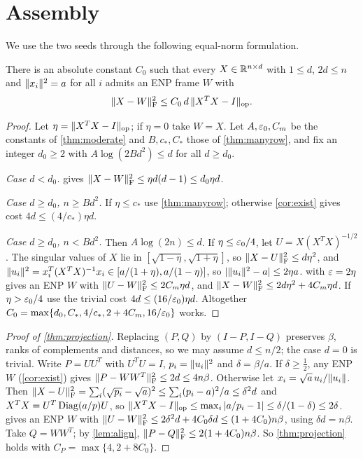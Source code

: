\section{Assembly}\label{sec:assembly}

We use the two seeds through the following equal-norm formulation.

\begin{proposition}\label{prop:equalrow}
There is an absolute constant $C_0$ such that every $X\in\mathbb R^{n\times d}$ with
$1\le d$, $2d\le n$ and $\lVert x_i\rVert^2=a$ for all $i$ admits an ENP frame $W$
with
\[
 \lVert X-W\rVert_{\mathrm F}^2\le C_0\,d\,\lVert X^TX-I\rVert_{\mathrm{op}}.
\]
\end{proposition}

\begin{proof}
Let $\eta=\lVert X^TX-I\rVert_{\mathrm{op}}$; if $\eta=0$ take $W=X$. Let $A,\varepsilon_0,C_m$ be the
constants of \cref{thm:moderate} and $B,c_*,C_*$ those of \cref{thm:manyrow},
and fix an integer $d_0\ge2$ with $A\log(2Bd^2)\le d$ for all $d\ge d_0$.

\emph{Case $d<d_0$.}  gives $\lVert X-W\rVert_{\mathrm F}^2\le\eta d(d-1)\le d_0\eta d$.

\emph{Case $d\ge d_0$, $n\ge Bd^2$.} If $\eta\le c_*$ use \cref{thm:manyrow};
otherwise \cref{cor:exist} gives cost $4d\le(4/c_*)\eta d$.

\emph{Case $d\ge d_0$, $n<Bd^2$.} Then $A\log(2n)\le d$. If $\eta\le\varepsilon_0/4$, let
$U=X(X^TX)^{-1/2}$. The singular values of $X$ lie in
$[\sqrt{1-\eta},\sqrt{1+\eta}]$, so $\lVert X-U\rVert_{\mathrm F}^2\le d\eta^2$, and
$\lVert u_i\rVert^2=x_i^T(X^TX)^{-1}x_i\in[a/(1+\eta),a/(1-\eta)]$, so
$|\lVert u_i\rVert^2-a|\le2\eta a$.  with $\varepsilon=2\eta$ gives an ENP
$W$ with $\lVert U-W\rVert_{\mathrm F}^2\le2C_m\eta d$, and
$\lVert X-W\rVert_{\mathrm F}^2\le2d\eta^2+4C_m\eta d$. If $\eta>\varepsilon_0/4$ use the trivial cost
$4d\le(16/\varepsilon_0)\eta d$. Altogether
$C_0=\max\{d_0,C_*,4/c_*,2+4C_m,16/\varepsilon_0\}$ works.
\end{proof}

\begin{proof}[Proof of \cref{thm:projection}]
Replacing $(P,Q)$ by $(I-P,I-Q)$ preserves $\beta$, ranks of complements and
distances, so we may assume $d\le n/2$; the case $d=0$ is trivial. Write
$P=UU^T$ with $U^TU=I$, $p_i=\lVert u_i\rVert^2$ and $\delta=\beta/a$. If
$\delta\ge\frac12$, any ENP $W$ (\cref{cor:exist}) gives
$\lVert P-WW^T\rVert_{\mathrm F}^2\le2d\le4n\beta$. Otherwise let $x_i=\sqrt a\,u_i/\lVert u_i\rVert$. Then
$\lVert X-U\rVert_{\mathrm F}^2=\sum_i(\sqrt{p_i}-\sqrt a)^2\le\sum_i(p_i-a)^2/a\le\delta^2d$ and
$X^TX=U^T\operatorname{Diag}(a/p)U$, so $\lVert X^TX-I\rVert_{\mathrm{op}}\le\max_i|a/p_i-1|\le\delta/(1-\delta)\le
2\delta$.  gives an ENP $W$ with
$\lVert U-W\rVert_{\mathrm F}^2\le2\delta^2d+4C_0\delta d\le(1+4C_0)n\beta$, using $\delta d=n\beta$.
Take $Q=WW^T$; by \cref{lem:align}, $\lVert P-Q\rVert_{\mathrm F}^2\le2(1+4C_0)n\beta$. So
\cref{thm:projection} holds with $C_P=\max\{4,2+8C_0\}$.
\end{proof}


